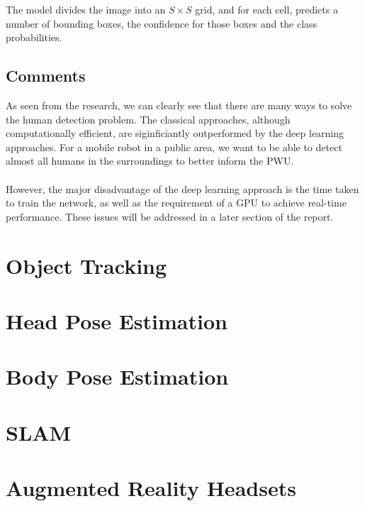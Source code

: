 The model divides the image into an $S \times S$ grid, and for each cell, predicts a number of bounding boxes, the confidence for those boxes and the class probabilities.

\subsection{Comments}
As seen from the research, we can clearly see that there are many ways to solve the human detection problem. The classical approaches, although computationally efficient, are siginficiantly outperformed by the deep learning approaches. For a mobile robot in a public area, we want to be able to detect almost all humans in the surroundings to better inform the PWU.

\paragraph{}However, the major disadvantage of the deep learning approach is the time taken to train the network, as well as the requirement of a GPU to achieve real-time performance. These issues will be addressed in a later section of the report.

\section{Object Tracking}

\section{Head Pose Estimation}

\section{Body Pose Estimation}

\section{SLAM}

\section{Augmented Reality Headsets}